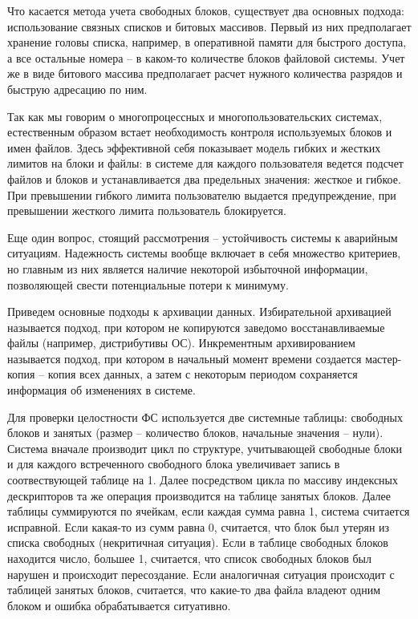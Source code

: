 \documentclass[a4paper,12pt,titlepage,finall]{article}
\begin{document}
Что касается метода учета свободных блоков, существует два основных подхода: использование связных списков и битовых массивов. Первый из них предполагает хранение головы списка, например, в оперативной памяти для быстрого доступа, а все остальные номера -- в каком-то количестве блоков файловой системы. Учет же в виде битового массива предполагает расчет нужного количества разрядов и быструю адресацию по ним.

Так как мы говорим о многопроцессных и многопользовательских системах, естественным образом встает необходимость контроля используемых блоков и имен файлов. Здесь эффективной себя показывает модель гибких и жестких лимитов на блоки и файлы: в системе для каждого пользователя ведется подсчет файлов и блоков и устанавливается два предельных значения: жесткое и гибкое. При превышении гибкого лимита пользователю выдается предупреждение, при превышении жесткого лимита пользователь блокируется.

Еще один вопрос, стоящий рассмотрения -- устойчивость системы к аварийным ситуациям. Надежность системы вообще включает в себя множество критериев, но главным из них является наличие некоторой избыточной информации, позволяющей свести потенциальные потери к минимуму.

Приведем основные подходы к архивации данных. Избирательной архивацией называется подход, при котором не копируются заведомо восстанавливаемые файлы (например, дистрибутивы ОС). Инкрементным архивированием называется подход, при котором в начальный момент времени создается мастер-копия -- копия всех данных, а затем с некоторым периодом сохраняется информация об изменениях в системе.

Для проверки целостности ФС используется две системные таблицы: свободных блоков и занятых (размер -- количество блоков, начальные значения -- нули). Система вначале производит цикл по структуре, учитывающей свободные блоки и для каждого встреченного свободного блока увеличивает запись в соотвествующей таблице на 1. Далее посредством цикла по массиву индексных дескрипторов та же операция производится на таблице занятых блоков. Далее таблицы суммируются по ячейкам, если каждая сумма равна 1, система считается исправной. Если какая-то из сумм равна 0, считается, что блок был утерян из списка свободных (некритичная ситуация). Если в таблице свободных блоков находится число, большее 1, считается, что список свободных блоков был нарушен и происходит пересоздание. Если аналогичная ситуация происходит с таблицей занятых блоков, считается, что какие-то два файла владеют одним блоком и ошибка обрабатывается ситуативно.
\end{document}
